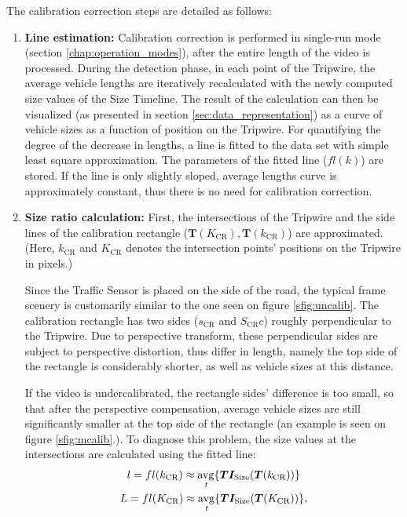\noindent The calibration correction steps are detailed as follows:
\begin{enumerate}[align=parleft]
	\item  \textbf{Line estimation:} 
	Calibration correction is performed in single-run mode (section \ref{chap:operation_modes}), after the entire length of the video is processed.
	During the detection phase, in each point of the Tripwire, the average vehicle lengths are iteratively recalculated with the newly computed size values of the Size Timeline.
	The result of the calculation can then be visualized (as presented in section \ref{sec:data_representation}) as a curve of vehicle sizes as a function of position on the Tripwire.
	For quantifying the degree of the decrease in lengths, a line is fitted to the data set with simple least square approximation.
	The parameters of the fitted line ($fl(k)$) are stored.
	If the line is only slightly sloped, average lengths curve is approximately constant, thus there is no need for calibration correction. 
	
	\item  \textbf{Size ratio calculation:}
	First, the intersections of the Tripwire and the side lines of the calibration rectangle ($\boldsymbol{T}(K_{\text{CR}}), \boldsymbol{T}(k_{\text{CR}})$) are approximated.
	(Here, $k_{\text{CR}}$ and $K_{\text{CR}}$ denotes the intersection points' positions on the Tripwire in pixels.)
	
	Since the Traffic Sensor is placed on the side of the road, the typical frame scenery is customarily similar to the one seen on figure \ref{sfig:uncalib}.
	The calibration rectangle has two sides ($s_{\text{CR}}$ and $S_{\text{CR}}c$) roughly perpendicular to the Tripwire.
	Due to perspective transform, these perpendicular sides are subject to perspective distortion, thus differ in length, namely the top side of the rectangle is considerably shorter, as well as vehicle sizes at this distance.
	
	If the video is undercalibrated, the rectangle sides' difference is too small, so that after the perspective compensation, average vehicle sizes are still significantly smaller at the top side of the rectangle (an example is seen on figure \ref{sfig:mcalib}.).
	To diagnose this problem, the size values at the intersections are calculated using the fitted line:
	\begin{gather*}
		l = fl(k_{\text{CR}}) \approx \operatorname{\underset{\textit{t}}{avg}}\{\boldsymbol{TI_{\text{Size}}}(\boldsymbol{T}(k_{\text{CR}}))\} \\
		L = fl(K_{\text{CR}}) \approx \operatorname{\underset{\textit{t}}{avg}}\{\boldsymbol{TI_{\text{Size}}}(\boldsymbol{T}(K_{\text{CR}}))\},
	\end{gather*}
	

\end{enumerate}

